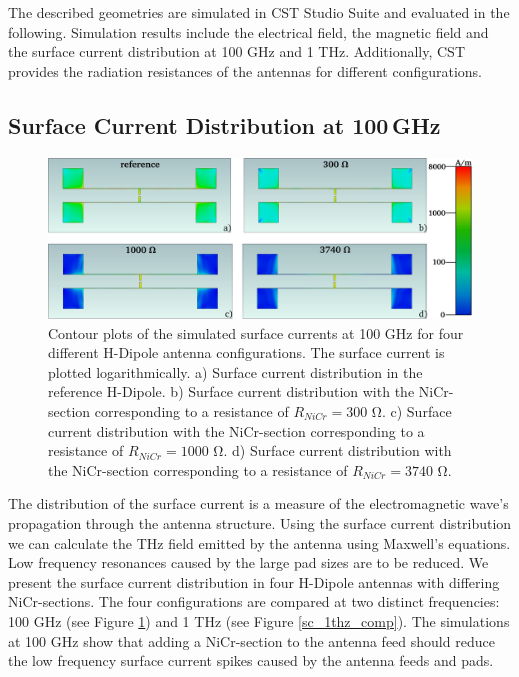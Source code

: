 The described geometries are simulated in CST Studio Suite and evaluated in the following. Simulation results include the electrical field, the magnetic field and the surface current distribution at \num{100} \si{\giga \hertz} and \num{1} \si{\tera \hertz}. Additionally, CST provides the radiation resistances of the antennas for different configurations. 

\subsection{Surface Current Distribution at 100\,GHz}

\begin{figure}[ht]
    \centering
    \includegraphics[width=\linewidth]{figures/Contour_Plots_v2/100Ghz_SC_sim_plots.pdf}
    \caption{Contour plots of the simulated surface currents at \num{100} \si{\giga \hertz} for four different H-Dipole antenna configurations. The surface current is plotted logarithmically. a) Surface current distribution in the reference H-Dipole. b) Surface current distribution with the NiCr-section corresponding to a resistance of $R_{NiCr} = 300$ \si{\ohm}. c) Surface current distribution with the NiCr-section corresponding to a resistance of $R_{NiCr} = 1000$ \si{\ohm}. d) Surface current distribution with the NiCr-section corresponding to a resistance of $R_{NiCr} = 3740$ \si{\ohm}.}
    \label{sc_100ghz_comp}
\end{figure}

The distribution of the surface current is a measure of the electromagnetic wave's propagation through the antenna structure. Using the surface current distribution we can calculate the THz field emitted by the antenna using Maxwell's equations. Low frequency resonances caused by the large pad sizes are to be reduced. We present the surface current distribution in four H-Dipole antennas with differing NiCr-sections. The four configurations are compared at two distinct frequencies: \num{100} \si{\giga \hertz} (see Figure \ref{sc_100ghz_comp}) and \num{1} \si{\tera \hertz} (see Figure \ref{sc_1thz_comp}). The simulations at \num{100} \si{\giga \hertz} show that adding a NiCr-section to the antenna feed should reduce the low frequency surface current spikes caused by the antenna feeds and pads.

